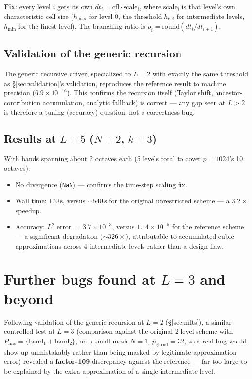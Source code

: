 \documentclass[11pt]{article}
\newcommand{\code}[1]{\texttt{#1}}
\begin{document}
\textbf{Fix}: every level $i$ gets its own $dt_i = \mathrm{cfl} \cdot
\mathrm{scale}_i$, where $\mathrm{scale}_i$ is that level's own
characteristic cell size ($h_{\max}$ for level 0, the threshold
$h_{c,i}$ for intermediate levels, $h_{\min}$ for the finest level). The
branching ratio is $p_i = \mathrm{round}(dt_i / dt_{i+1})$.

\subsection{Validation of the generic recursion}

The generic recursive driver, specialized to $L=2$ with exactly the same
threshold as \S\ref{sec:validation}'s validation, reproduces the
reference result to machine precision ($6.9\times 10^{-16}$). This
confirms the recursion itself (Taylor shift, ancestor-contribution
accumulation, analytic fallback) is correct --- any gap seen at $L>2$ is
therefore a tuning (accuracy) question, not a correctness bug.

\subsection{Results at $L=5$ ($N=2$, $k=3$)}

With bands spanning about 2 octaves each (5 levels total to cover
$p=1024$'s 10 octaves):
\begin{itemize}
  \item No divergence (\code{NaN}) --- confirms the time-step scaling
  fix.
  \item Wall time: $170\,\mathrm{s}$, versus $\sim 540\,\mathrm{s}$ for
  the original unrestricted scheme --- a $3.2\times$ speedup.
  \item Accuracy: $L^2$ error $= 3.7\times 10^{-3}$, versus
  $1.14\times 10^{-5}$ for the reference scheme --- a significant
  degradation ($\sim 326\times$), attributable to accumulated cubic
  approximations across 4 intermediate levels rather than a design flaw.
\end{itemize}

\section{Further bugs found at $L=3$ and beyond}
\label{sec:l3bugs}

Following validation of the generic recursion at $L=2$ (\S\ref{sec:mlts}),
a similar controlled test at $L=3$ (comparison against the original
2-level scheme with $P_{\text{fine}}=\{\text{band}_1+\text{band}_2\}$, on
a small mesh $N=1$, $p_{\text{global}}=32$, so a real bug would show up
unmistakably rather than being masked by legitimate approximation error)
revealed a \textbf{factor-109} discrepancy against the reference --- far
too large to be explained by the extra approximation of a single
intermediate level.
\end{document}
